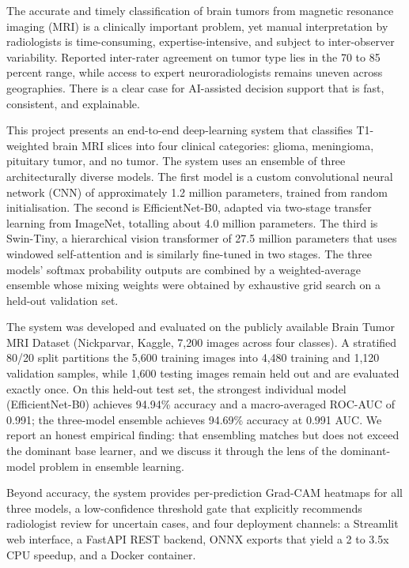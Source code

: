 \documentclass[12pt,a4paper,oneside]{report}
\begin{document}
The accurate and timely classification of brain tumors from magnetic
resonance imaging (MRI) is a clinically important problem, yet manual
interpretation by radiologists is time-consuming, expertise-intensive,
and subject to inter-observer variability. Reported inter-rater agreement
on tumor type lies in the 70 to 85 percent range, while access to expert
neuroradiologists remains uneven across geographies. There is a clear
case for AI-assisted decision support that is fast, consistent, and
explainable.

This project presents an end-to-end deep-learning system that classifies
T1-weighted brain MRI slices into four clinical categories: glioma,
meningioma, pituitary tumor, and no tumor. The system uses an ensemble of
three architecturally diverse models. The first model is a custom
convolutional neural network (CNN) of approximately 1.2 million
parameters, trained from random initialisation. The second is
EfficientNet-B0, adapted via two-stage transfer learning from ImageNet,
totalling about 4.0 million parameters. The third is Swin-Tiny, a
hierarchical vision transformer of 27.5 million parameters that uses
windowed self-attention and is similarly fine-tuned in two stages. The
three models' softmax probability outputs are combined by a
weighted-average ensemble whose mixing weights were obtained by
exhaustive grid search on a held-out validation set.

The system was developed and evaluated on the publicly available Brain
Tumor MRI Dataset (Nickparvar, Kaggle, 7,200 images across four classes).
A stratified 80/20 split partitions the 5,600 training images into 4,480
training and 1,120 validation samples, while 1,600 testing images remain
held out and are evaluated exactly once. On this held-out test set, the
strongest individual model (EfficientNet-B0) achieves 94.94\% accuracy
and a macro-averaged ROC-AUC of 0.991; the three-model ensemble achieves
94.69\% accuracy at 0.991 AUC. We report an honest empirical finding:
that ensembling matches but does not exceed the dominant base learner,
and we discuss it through the lens of the dominant-model problem in
ensemble learning.

Beyond accuracy, the system provides per-prediction Grad-CAM heatmaps
for all three models, a low-confidence threshold gate that explicitly
recommends radiologist review for uncertain cases, and four deployment
channels: a Streamlit web interface, a FastAPI REST backend, ONNX
exports that yield a 2 to 3.5x CPU speedup, and a Docker container.
\end{document}

